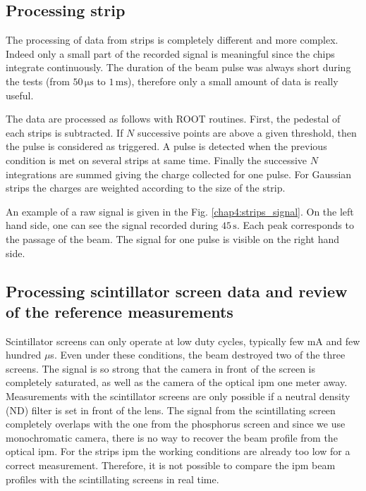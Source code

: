 \begin{refsection}
  

  \subsection{Processing strip}
  The processing of data from strips is completely different and more complex. Indeed only a small part of the recorded signal is meaningful since the chips integrate continuously. The duration of the beam pulse was always short during the tests (from $50\,\mathrm{\mu s}$ to $1\,\mathrm{ms}$), therefore only a small amount of data is really useful.
  

  The data are processed as follows with ROOT\cite{Brun1997,Antcheva2009} routines. First, the pedestal of each strips is subtracted. If $N$ successive points are above a given threshold, then the pulse is considered as triggered. A pulse is detected when the previous condition is met on several strips at same time. Finally the successive $N$ integrations are summed giving the charge collected for one pulse. For Gaussian strips the charges are weighted according to the size of the strip.

  An example of a raw signal is given in the Fig. \ref{chap4:strips_signal}. On the left hand side, one can see the signal recorded during $45\,\mathrm{s}$. Each peak corresponds to the passage of the beam. The signal for one pulse is visible on the right hand side.


  \subsection{Processing scintillator screen data and review of the reference measurements}

  Scintillator screens can only operate at low duty cycles, typically few mA and few hundred $\mu$s. Even under these conditions, the beam destroyed two of the three screens. The signal is so strong that the camera in front of the screen is completely saturated, as well as the camera of the optical \acrshort{ipm} one meter away. Measurements with the scintillator screens are only possible if a neutral density (ND) filter is set in front of the lens. The signal from the scintillating screen completely overlaps with the one from the phosphorus screen and since we use monochromatic camera, there is no way to recover the beam profile from the optical \acrshort{ipm}. For the strips \acrshort{ipm} the working conditions are already too low for a correct measurement. Therefore, it is not possible to compare the \acrshort{ipm} beam profiles with the scintillating screens in real time.
  


\end{refsection}
